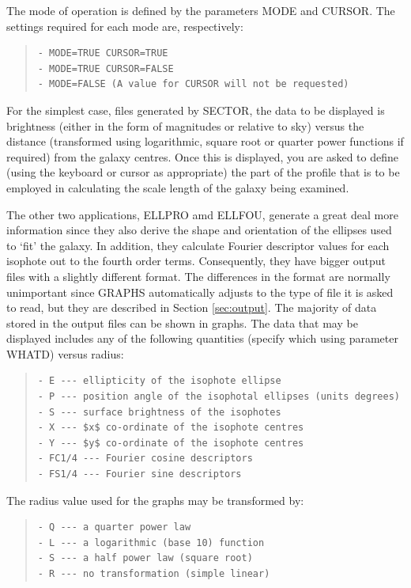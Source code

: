 \documentclass[twoside,11pt]{article}
\newenvironment{myquote}{\begin{quote}\begin{small}}{\end{small}\end{quote}}
\begin{document}
The mode of operation is defined by the parameters  MODE and CURSOR. 
The settings required for each mode are, respectively:

\begin{myquote}
\begin{verbatim}
- MODE=TRUE CURSOR=TRUE
- MODE=TRUE CURSOR=FALSE
- MODE=FALSE (A value for CURSOR will not be requested)
\end{verbatim}
\end{myquote}

For the simplest case, files generated by SECTOR, the data 
to be displayed is brightness (either in the form of magnitudes or relative 
to sky) versus the distance (transformed using logarithmic, square root 
or quarter power functions if required) from the galaxy centres. Once this 
is displayed, you are asked to define (using the keyboard or 
cursor as appropriate) the part of the profile that is to be employed in 
calculating the scale length of the galaxy being examined.

The other two applications, ELLPRO amd ELLFOU, generate a great deal more 
information since they also derive the shape and orientation of the ellipses 
used to `fit' the galaxy. In addition, they calculate Fourier descriptor 
values for each isophote out to the fourth order terms.  Consequently, 
they have bigger output files with a slightly different format. The
differences in the format are normally unimportant since GRAPHS 
automatically adjusts to the type of file it is asked to
read, but they are described in Section \ref{sec:output}. The majority of data 
stored in the output files can be shown in graphs. The data that may be 
displayed includes any of the following quantities (specify which using 
parameter WHATD) versus radius:

\begin{myquote}
\begin{verbatim}
- E --- ellipticity of the isophote ellipse
- P --- position angle of the isophotal ellipses (units degrees)
- S --- surface brightness of the isophotes 
- X --- $x$ co-ordinate of the isophote centres
- Y --- $y$ co-ordinate of the isophote centres
- FC1/4 --- Fourier cosine descriptors
- FS1/4 --- Fourier sine descriptors
\end{verbatim}
\end{myquote}

The radius value used for the graphs may be transformed by:

\begin{myquote}
\begin{verbatim}
- Q --- a quarter power law
- L --- a logarithmic (base 10) function
- S --- a half power law (square root)
- R --- no transformation (simple linear)
\end{verbatim}
\end{myquote}
\end{document}
